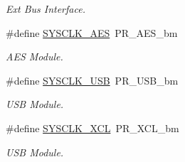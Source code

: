 \begin{DoxyCompactItemize}
\begin{DoxyCompactList}\small\item\em Ext Bus Interface. \end{DoxyCompactList}\item 
\hypertarget{group__sysclk__group_gaf5277864953c6741dba18c3dc180dd1e}{\#define \hyperlink{group__sysclk__group_gaf5277864953c6741dba18c3dc180dd1e}{S\-Y\-S\-C\-L\-K\-\_\-\-A\-E\-S}~P\-R\-\_\-\-A\-E\-S\-\_\-bm}\label{group__sysclk__group_gaf5277864953c6741dba18c3dc180dd1e}

\begin{DoxyCompactList}\small\item\em A\-E\-S Module. \end{DoxyCompactList}\item 
\hypertarget{group__sysclk__group_ga0acdf4ca4b306373eb79b5fbc7409be7}{\#define \hyperlink{group__sysclk__group_ga0acdf4ca4b306373eb79b5fbc7409be7}{S\-Y\-S\-C\-L\-K\-\_\-\-U\-S\-B}~P\-R\-\_\-\-U\-S\-B\-\_\-bm}\label{group__sysclk__group_ga0acdf4ca4b306373eb79b5fbc7409be7}

\begin{DoxyCompactList}\small\item\em U\-S\-B Module. \end{DoxyCompactList}\item 
\hypertarget{group__sysclk__group_ga48b75d36ef09052741df41d66e9f5f1e}{\#define \hyperlink{group__sysclk__group_ga48b75d36ef09052741df41d66e9f5f1e}{S\-Y\-S\-C\-L\-K\-\_\-\-X\-C\-L}~P\-R\-\_\-\-X\-C\-L\-\_\-bm}\label{group__sysclk__group_ga48b75d36ef09052741df41d66e9f5f1e}

\begin{DoxyCompactList}\small\item\em U\-S\-B Module. \end{DoxyCompactList}\end{DoxyCompactItemize}
